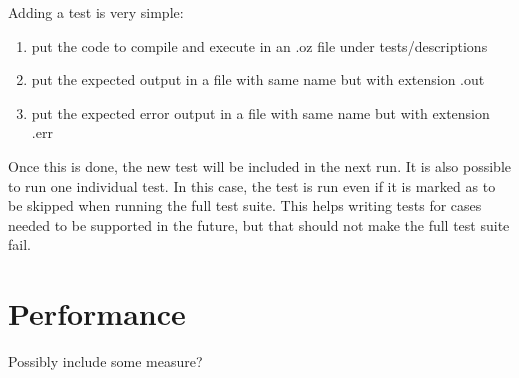 \documentclass[a4paper]{memoir}
\begin{document}
Adding a test is very simple:
\begin{enumerate}
  \item put the code to compile and execute in an .oz file under tests/descriptions
  \item put the expected output in a file with same name but with extension .out
  \item put the expected error output in a file with same name but with extension .err
\end{enumerate}
Once this is done, the new test will be included in the next run.
It is also possible to run one individual test. In this case, the test is run
even if it is marked as to be skipped when running the full test suite. This helps writing tests for cases needed to be supported in the future, but that should not make the full test suite fail.
\section{Performance}
Possibly include some measure?
\end{document}

